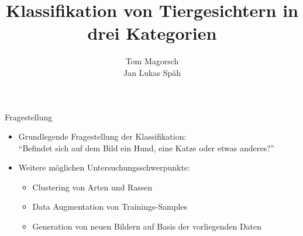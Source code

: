 \documentclass[aspectratio=1610, 9pt]{beamer}
\title{Klassifikation von Tiergesichtern in drei Kategorien}
\author[T.~Magorsch,~J.~L.~Späh]{Tom Magorsch\\ Jan Lukas Späh}
\institute[ML-Seminar]{\\[0.3cm]TU Dortmund \\ \Large ML-Seminar}
\begin{document}
\maketitle




\begin{frame}{Fragestellung}
\begin{itemize}
  \item Grundlegende Fragestellung der Klassifikation:\\
  \rightarrow{} ``Befindet sich auf dem Bild ein Hund, eine Katze oder etwas anderes?''
  \vspace{0.5cm}
  \item Weitere möglichen Untersuchungsschwerpunkte:
  \begin{itemize}
    \item Clustering von Arten und Rassen
    \item Data Augmentation von Trainings-Samples
    \item Generation von neuen Bildern auf Basis der vorliegenden Daten
  \end{itemize}
\end{itemize}



\end{frame}
\end{document}
